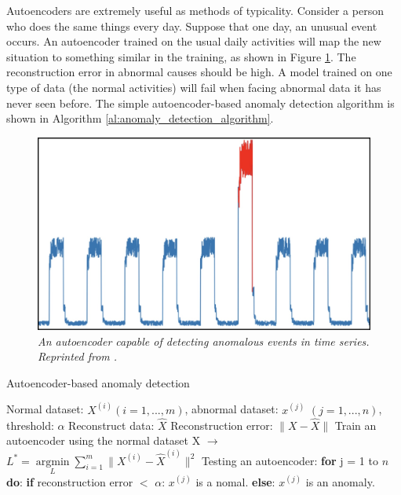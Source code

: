 Autoencoders are extremely useful as methods of typicality. Consider a person who does the same things every day. Suppose that one day, an unusual event occurs. An autoencoder trained on the usual daily activities will map the new situation to something similar in the training, as shown in Figure \ref{fig:ae_detection}. The reconstruction error in abnormal causes should be high. A model trained on one type of data (the normal activities) will fail when facing abnormal data it has never seen before. The simple autoencoder-based anomaly detection algorithm is shown in Algorithm \ref{al:anomaly_detection_algorithm}.

\begin{figure}[H]
  \centering
  \caption[An autoencoder capable of detecting anomalous events in time series.]{\emph{An autoencoder capable of detecting anomalous events in time series. \\ Reprinted from \citeauthor{pavithrasv_2020} \citeyear{pavithrasv_2020}.}}\label{fig:ae_detection}
  \includegraphics[scale = 0.2]{figures/ae_detection.jpg}
\end{figure}

\renewcommand{\algorithmicrequire}{\textbf{Input:}}
\renewcommand{\algorithmicensure}{\textbf{Output:}}
\renewcommand{\algorithmicforall}{\textbf{for each}}

\begin{algorithm}[H]
  \caption{Autoencoder-based anomaly detection }
  \label{al:anomaly_detection_algorithm}
  \begin{algorithmic}
    \REQUIRE Normal dataset: $X^{(i)} (i = 1,..., m)$, abnormal dataset: $x^{(j)}$ $(j = 1, ..., n)$, threshold: $\alpha$
    \ENSURE Reconstruct data: $\hat{X}$
    \STATE Reconstruction error: $\| X - \hat{X} \|$
    \STATE Train an autoencoder using the normal dataset X $\rightarrow$ $L^* = \underset{L} {\operatorname{argmin}} \sum_{i=1}^m \| {X}^{(i)} - \hat X^{(i)} \| ^ 2$
    \STATE Testing an autoencoder:
    \STATE \textbf{for} j = 1 to $n$ \textbf{do}:
    \STATE \indent \textbf{if} reconstruction error $<$ $\alpha$:
    \STATE \indent \indent $x^{(j)}$ is a nomal.
    \STATE \indent \textbf{else}:
    \STATE \indent \indent $x^{(j)}$ is an anomaly.
  \end{algorithmic}
\end{algorithm}


